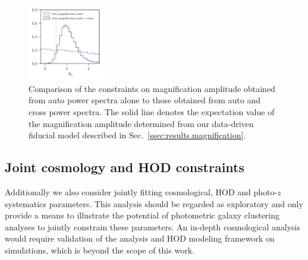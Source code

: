 \documentclass[a4paper,11pt]{article}
\begin{document}
    \begin{figure}
      \begin{center}
        \includegraphics[width=0.3\textwidth]{figures/contours-A_mu_mPk=HOD_fix=alpha-fc-sigmaM_HOD=zevol_fit=pz-shifts+prior=0p2-pz-widths+prior=0p2_fit=auto+cross_cosmo=const-LINBIAS_HOD-param=zfid_clfit=HOD-zevol_mag-bias-free-fit=auto+cross-vs-mag-bias-free-fit=auto.pdf}
        \caption{Comparison of the constraints on magnification amplitude obtained from auto power spectra alone to those obtained from auto and cross power spectra. The solid line denotes the expectation value of the magnification amplitude determined from our data-driven fiducial model described in Sec.~\ref{ssec:results.magnification}.}
        \label{fig:constraints-fit=mag-bias-ampl_fit=auto+cross-vs-fit=mag-bias-ampl_fit=auto}
      \end{center}
    \end{figure}

  \subsection{Joint cosmology and HOD constraints}\label{ssec:results.cosmo}
    Additionally we also consider jointly fitting cosmological, HOD and photo-$z$ systematics parameters. This analysis should be regarded as exploratory and only provide a means to illustrate the potential of photometric galaxy clustering analyses to jointly constrain these parameters. An in-depth cosmological analysis would require validation of the analysis and HOD modeling framework on simulations, which is beyond the scope of this work.
\end{document}
